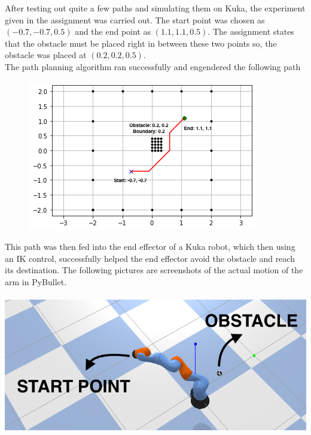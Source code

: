 \documentclass[a4paper]{article}
\begin{document}
After testing out quite a few paths and simulating them on Kuka, the experiment given in the assignment was carried out. The start point was chosen as $(-0.7, -0.7, 0.5)$ and the end point as $(1.1, 1.1, 0.5)$. The assignment states that the obstacle must be placed right in between these two points so, the obstacle was placed at $(0.2, 0.2, 0.5)$. \\
The path planning algorithm ran successfully and engendered the following path
\begin{figure}[h]
\includegraphics[scale=0.9]{images/img3.png}
\centering
\end{figure}
\newpage
This path was then fed into the end effector of a Kuka robot, which then using an IK control, successfully helped the end effector avoid the obstacle and reach its destination. The following pictures are screenshots of the actual motion of the arm in PyBullet.\\\\
\includegraphics[scale=0.6]{images/img4.png}
\end{document}
